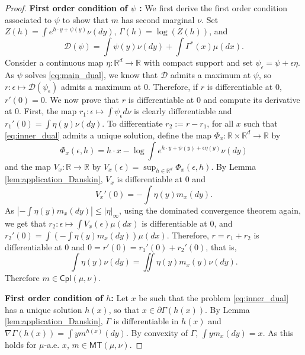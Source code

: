 \documentclass[reqno, a4paper]{amsart}
\theoremstyle{plain}
\theoremstyle{definition}
\theoremstyle{remark}
\numberwithin{equation}{section}
\numberwithin{theorem}{section}
\newcommand{\R}{\mathbb{R}}
\newcommand{\MT}{\mathsf{MT}}
\newcommand{\Cpl}{\mathsf{Cpl}}
\begin{document}
	\begin{proof}
		\textbf{First order condition of $\psi$ :} We first derive the first order condition associated to $\psi$ to show that $m$ has second marginal $\nu$. Set $Z(h) = \int e^{h \cdot y + \psi(y)} \nu(dy)$, $\Gamma(h) = \log(Z(h))$, and $$\mathcal{D}(\psi) = \int \psi(y) \nu(dy) + \int \Gamma^*(x) \mu(dx).$$ Consider a continuous map $\eta: \R^d \to \R$ with compact support and set $\psi_\epsilon = \psi + \epsilon \eta$. As $\psi$ solves \eqref{eq:main_dual}, we know that $\mathcal{D}$ admits a maximum at $\psi$, so $r : \epsilon \mapsto \mathcal{D}(\psi_\epsilon)$ admits a maximum at $0$. Therefore, if $r$ is differentiable at $0$, $r'(0) = 0$. We now prove that $r$ is differentiable at $0$ and compute its derivative at $0$. First, the map $r_1 : \epsilon \mapsto \int \psi_\epsilon d \nu$ is clearly differentiable and $r_1'(0) = \int \eta(y) \nu(dy)$. To differentiate $r_2 := r - r_1$, for all $x$ such that \eqref{eq:inner_dual} admits a unique solution, define the map $\Phi_x : \R \times \R^d \to \R$ by $$\Phi_x(\epsilon,h) = h \cdot x - \log \int e^{h \cdot y + \psi(y) + \epsilon \eta(y)}\nu(dy)$$ and the map
		$V_x : \R \to \R$ by $V_x(\epsilon) = \sup_{h \in \R^d} \Phi_x(\epsilon,h)$. 
		By Lemma \ref{lem:application_Danskin}, $V_x$ is differentiable at 0 and  
		\begin{equation*}
			V_x'(0) = - \int \eta(y) m_x(dy). 
		\end{equation*}
		As $\left| - \int \eta(y) m_x(dy) \right| \leq |\eta|_\infty$, using the dominated convergence theorem again, we get that $r_2 : \epsilon \mapsto \int V_x(\epsilon) \mu(dx)$ is differentiable at $0$, and $r_2'(0) = \int \left( - \int \eta(y) m_x(dy) \right) \mu(dx).$ Therefore, $r = r_1 + r_2$ is differentiable at $0$ and $0 = r'(0) = r_1'(0) + r_2'(0)$, that is,
		\begin{equation*}\label{eq:m_second_marg_nu}
			\int \eta(y) \nu(dy) = \iint  \eta(y) m_x(y) \nu(dy).
		\end{equation*}
		Therefore $m \in \Cpl(\mu,\nu)$.
		
		\vspace{0.5cm}
		\noindent\textbf{First order condition of $h$:} Let $x$ be such that the problem \eqref{eq:inner_dual} has a unique solution $h(x)$, so that $x \in \partial \Gamma(h(x))$. By Lemma \ref{lem:application_Danskin}, $\Gamma$ is differentiable in $h(x)$ and $\nabla \Gamma (h(x)) = \int y m^{h(x)}(dy)$. By convexity of $\Gamma$, $\int y m_x(dy) = x$. As this holds for $\mu$-a.e. $x$, $m \in \MT(\mu,\nu)$.
		\vspace{0.5cm}
		

\end{proof}
\end{document}
